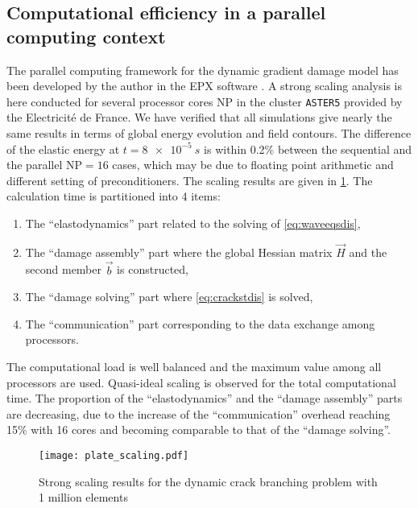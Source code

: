 \subsection{Computational efficiency in a parallel computing context}
The parallel computing framework for the dynamic gradient damage model has been developed by the author in the EPX software \cite{EPX:2015}. A strong scaling analysis is here conducted for several processor cores $\mathrm{NP}$ in the cluster \texttt{ASTER5} provided by the Electricité de France. We have verified that all simulations give nearly the same results in terms of global energy evolution and field contours. The difference of the elastic energy at $t=\SI{8e-5}{s}$ is within 0.2\% between the sequential and the parallel $\mathrm{NP}=16$ cases, which may be due to floating point arithmetic and different setting of preconditioners. The scaling results are given in \cref{fig:scaling}. The calculation time is partitioned into 4 items:
\begin{enumerate}
\item The ``elastodynamics'' part related to the solving of \eqref{eq:waveeqsdis},
\item The ``damage assembly'' part where the global Hessian matrix $\vec{H}$ and the second member $\vec{b}$ is constructed,
\item The ``damage solving'' part where \eqref{eq:crackstdis} is solved,
\item The ``communication'' part corresponding to the data exchange among processors.
\end{enumerate}
The computational load is well balanced and the maximum value among all processors are used. Quasi-ideal scaling is observed for the total computational time. The proportion of the ``elastodynamics'' and the ``damage assembly'' parts are decreasing, due to the increase of the ``communication'' overhead reaching 15\% with 16 cores and becoming comparable to that of the ``damage solving''.
\begin{figure}[htbp]
\centering
\texttt{[image: plate\_scaling.pdf]}
\caption{Strong scaling results for the dynamic crack branching problem with 1 million elements} \label{fig:scaling}
\end{figure}

